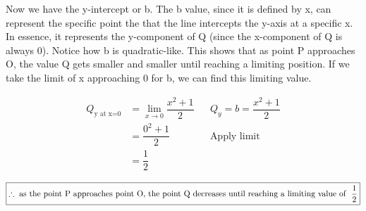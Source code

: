 \documentclass[12pt]{book}
\begin{document}
\begin{enumerate}
\newpage

\vspace{0.3cm}
Now we have the y-intercept or b. The b value, since it is defined by x, can 
represent the specific point the that the line intercepts the y-axis at a specific x. 
In essence, it represents the y-component of Q (since the x-component of Q is always 0). 
Notice how b is quadratic-like. This shows that as point P approaches O, the value 
Q gets smaller and smaller until reaching a limiting position. If we take the limit 
of x approaching 0 for b, we can find this limiting value.

\addtolength{\jot}{-0.2em}
\begin{align*}
    Q_{\text{y at x=0}} &= \lim_{x \to 0} \dfrac{x^2 + 1}{2} && Q_y = b = \dfrac{x^2 + 1}{2}\\
    &= \dfrac{0^2 + 1}{2} && \text{Apply limit} \\
    &= \dfrac{1}{2}
\end{align*}

$$\boxed{\therefore \text{ as the point P approaches point O, the point Q decreases until reaching a limiting value of \space} \dfrac{1}{2}}$$

\end{enumerate}
\end{document}
